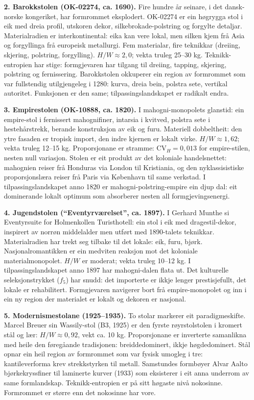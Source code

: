 \documentclass[10pt, a4paper, twocolumn]{article}
\begin{document}
\textbf{2. Barokkstolen (OK-02274, ca. 1690).} Fire hundre år seinare, i det dansk-norske kongeriket, har formrommet eksplodert. OK-02274 er ein høgrygga stol i eik med dreia profil, utskoren dekor, silkebrokade-polstring og forgylte detaljar. Materialradien er interkontinental: eika kan vere lokal, men silken kjem frå Asia og forgyllinga frå europeisk metallurgi. Fem materialar, fire teknikkar (dreiing, skjering, polstring, forgylling). $H/W \approx 2{,}0$; vekta truleg 25--30 kg. Teknikk-entropien har stige: formgjevaren har tilgang til dreiing, tapping, skjering, polstring og fernissering. Barokkstolen okkuperer ein region av formrommet som var fullstendig utilgjengeleg i 1280: kurva, dreia bein, polstra sete, vertikal autoritet. Funksjonen er den same; tilpassingslandskapet er radikalt endra.

\textbf{3. Empirestolen (OK-10888, ca. 1820).} I mahogni-monopolets glanstid: ein empire-stol i fernissert mahognifiner, intarsia i kvitved, polstra sete i hestehårstrekk, berande konstruksjon av eik og furu. Materiell dobbeltheit: den ytre fasaden er tropisk import, den indre kjernen er lokalt virke. $H/W \approx 1{,}62$; vekta truleg 12--15 kg. Proporsjonane er stramme: $\text{CV}_H = 0{,}013$ for empire-stilen, nesten null variasjon. Stolen er eit produkt av det koloniale handelsnettet: mahognien reiser frå Honduras via London til Kristiania, og den nyklassisistiske proporsjonslæra reiser frå Paris via København til same verkstad. I tilpassingslandskapet anno 1820 er mahogni-polstring-empire ein djup dal: eit dominerande lokalt optimum som absorberer nesten all formgjevingsenergi.

\textbf{4. Jugendstolen (``Eventyrværelset'', ca. 1897).} I Gerhard Munthe si Eventyrsuite for Holmenkollen Turisthotell: ein stol i eik med dragestil-dekor, inspirert av norrøn middelalder men utført med 1890-talets teknikkar. Materialradien har trekt seg tilbake til det lokale: eik, furu, bjørk. Nasjonalromantikken er ein medviten reaksjon mot det koloniale materialmonopolet. $H/W$ er moderat; vekta truleg 10--12 kg. I tilpassingslandskapet anno 1897 har mahogni-dalen flata ut. Det kulturelle seleksjonstrykket ($f_5$) har snudd: det importerte er ikkje lenger prestisjefullt, det lokale er rehabilitert. Formgjevaren navigerer bort frå empire-monopolet og inn i ein ny region der materialet er lokalt og dekoren er nasjonal.

\textbf{5. Modernismestolane (1925--1935).} To stolar markerer eit paradigmeskifte. Marcel Breuer sin Wassily-stol (B3, 1925) er den fyrste røyrstolstolen i kromert stål og lær: $H/W \approx 0{,}92$, vekt ca. 10 kg. Proporsjonane er inverterte samanlikna med heile den føregåande tradisjonen: breiddedominert, ikkje høgdedominert. Stål opnar ein heil region av formrommet som var fysisk umogleg i tre: kantileverforma krev strekkstyrken til metall. Samstundes formbøyer Alvar Aalto bjørkekryssfiner til laminerte kurver (1933) som eksisterer i eit anna underrom av same formlandskap. Teknikk-entropien er på sitt høgaste nivå nokosinne. Formrommet er større enn det nokosinne har vore.
\end{document}
